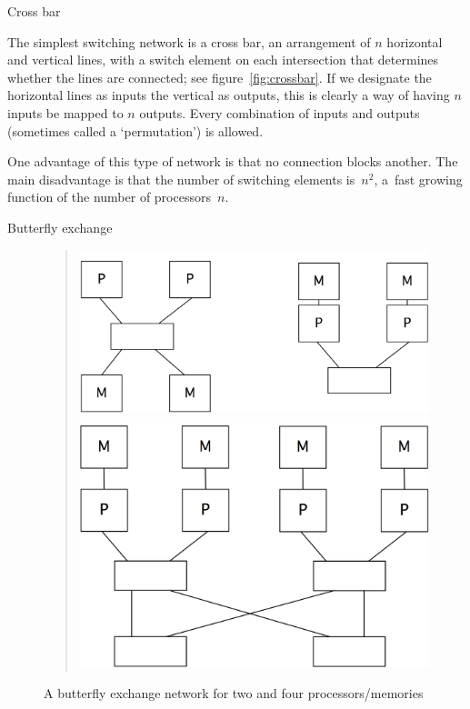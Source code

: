  {Cross bar}

\begin{notlulu}
  \crossbarfig
\end{notlulu}
%
The simplest switching network is a cross bar, an arrangement of $n$
horizontal and vertical lines, with a switch element on each
intersection that determines whether the lines are connected; see
figure~\ref{fig:crossbar}. If we designate the horizontal lines as
inputs the vertical as outputs, this is clearly a way of having $n$
inputs be mapped to $n$ outputs. Every combination of inputs and
outputs (sometimes called a `permutation') is allowed.

\begin{lulu}
  \crossbarfig
\end{lulu}
%
One advantage of this type of network is that no connection 
blocks another.
The main disadvantage  is that the number of 
switching elements is~$n^2$, a~fast growing function of the
number of processors~$n$.

 {Butterfly exchange}

\begin{figure}[ht]
  \begin{quote}
    \includegraphics[scale=.06]{graphics/butterfly1}\hspace{.5in}
    \includegraphics[scale=.06]{graphics/butterfly2}
  \end{quote}
  \caption{A butterfly exchange network for two and four processors/memories}
  \label{fig:butterfly}
\end{figure}

